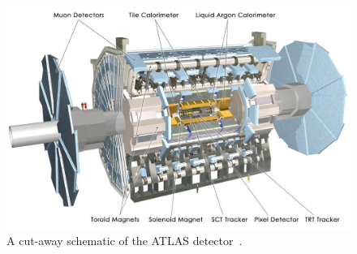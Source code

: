 \begin{figure}[!ht]
  \begin{center}
    \includegraphics[width=1\linewidth, angle=0]{figs/Detector/ATLAS_schem.jpg}
  \end{center}
  \caption[A cut-away schematic of the ATLAS detector.]{ A cut-away schematic of the ATLAS detector~\cite{det-ATLAS_Exp}.}
  \label{fig:det-ATLAS_schem}
\end{figure}

